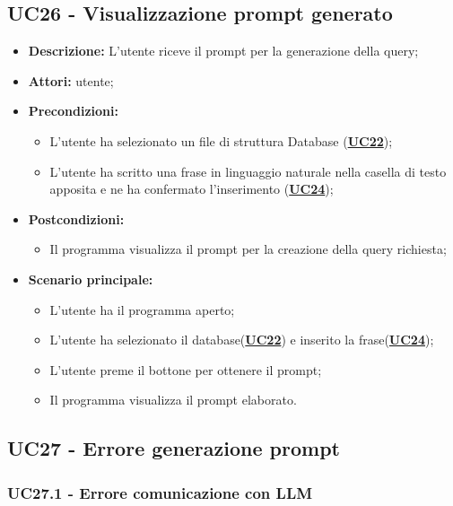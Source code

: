\subsection{UC26 - Visualizzazione prompt generato}
\label{sec:UC26}
\begin{itemize}
	\item \textbf{Descrizione:} L’utente riceve il prompt per la generazione della query;
	\item \textbf{Attori:} utente;
	\item \textbf{Precondizioni:} 
	\begin{itemize}
		\item L’utente ha selezionato un file di struttura Database (\hyperref[sec:UC22]{\textbf{UC22}});
		\item L’utente ha scritto una frase in linguaggio naturale nella casella di testo apposita e ne ha confermato l’inserimento (\hyperref[sec:UC24]{\textbf{UC24}});
	\end{itemize}
	\item \textbf{Postcondizioni:} 
	\begin{itemize}
		\item Il programma visualizza il prompt per la creazione della query richiesta;
	\end{itemize}
	\item \textbf{Scenario principale:} 
	\begin{itemize}
		\item L’utente ha il programma aperto;
		\item L’utente ha selezionato il database(\hyperref[sec:UC22]{\textbf{UC22}}) e inserito la frase(\hyperref[sec:UC24]{\textbf{UC24}});
		\item L’utente preme il bottone per ottenere il prompt;
		\item Il programma visualizza il prompt elaborato.
	\end{itemize}
\end{itemize}

\subsection{UC27 - Errore generazione prompt}
\label{sec:UC27}

\subsubsection{UC27.1 - Errore comunicazione con LLM}
\label{sec:UC27.1}

